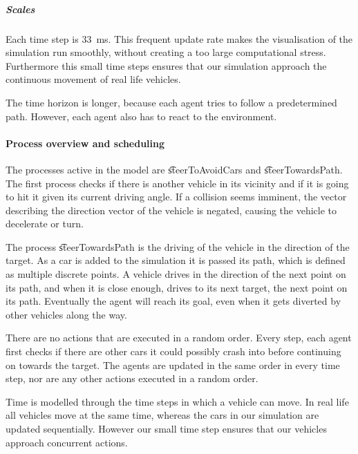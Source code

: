 	\subparagraph{Scales}
	Each time step is \si{33 \milli\second}. This frequent update rate makes the visualisation of the simulation run smoothly, without creating a too large computational stress. Furthermore this small time steps ensures that our simulation approach the continuous movement of real life vehicles.

	The time horizon is longer, because each agent tries to follow a predetermined path. However, each agent also has to react to the environment. 




\paragraph{Process overview and scheduling}
\label{par:method:model:overview:process}


The processes active in the model are \t{steerToAvoidCars} and \t{steerTowardsPath}. The first process checks if there is another vehicle in its vicinity and if it is going to hit it given its current driving angle. If a collision seems imminent, the vector describing the direction vector of the vehicle is negated, causing the vehicle to decelerate or turn.

The process \t{steerTowardsPath} is the driving of the vehicle in the direction of the target. As a car is added to the simulation it is passed its path, which is defined as multiple discrete points.  A vehicle drives in the direction of the next point on its path, and when it is close enough, drives to its next target, the next point on its path. Eventually the agent will reach its goal, even when it gets diverted by other vehicles along the way.

There are no actions that are executed in a random order.
Every step, each agent first checks if there are other cars it could possibly crash into before continuing on towards the target. The agents are updated in the same order in every time step, nor are any other actions executed in a random order.

Time is modelled through the time steps in which a vehicle can move. In real life all vehicles move at the same time, whereas the cars in our simulation are updated sequentially. However our small time step ensures that our vehicles approach concurrent actions. 


